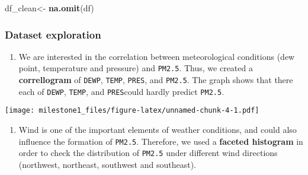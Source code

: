 \documentclass[]{article}
\newenvironment{Shaded}{\begin{snugshade}}{\end{snugshade}}
\newcommand{\CommentTok}[1]{\textcolor[rgb]{0.56,0.35,0.01}{\textit{#1}}}
\newcommand{\DataTypeTok}[1]{\textcolor[rgb]{0.13,0.29,0.53}{#1}}
\newcommand{\DecValTok}[1]{\textcolor[rgb]{0.00,0.00,0.81}{#1}}
\newcommand{\KeywordTok}[1]{\textcolor[rgb]{0.13,0.29,0.53}{\textbf{#1}}}
\newcommand{\NormalTok}[1]{#1}
\newcommand{\OperatorTok}[1]{\textcolor[rgb]{0.81,0.36,0.00}{\textbf{#1}}}
\newcommand{\OtherTok}[1]{\textcolor[rgb]{0.56,0.35,0.01}{#1}}
\newcommand{\StringTok}[1]{\textcolor[rgb]{0.31,0.60,0.02}{#1}}
\providecommand{\tightlist}{%
  \setlength{\itemsep}{0pt}\setlength{\parskip}{0pt}}
\begin{document}
\begin{Shaded}
\begin{Highlighting}[]
\NormalTok{df_clean<-}\StringTok{ }\KeywordTok{na.omit}\NormalTok{(df)}
\end{Highlighting}
\end{Shaded}

\hypertarget{dataset-exploration}{%
\subsubsection{Dataset exploration}\label{dataset-exploration}}

\begin{enumerate}
\def\labelenumi{\arabic{enumi}.}
\tightlist
\item
  We are interested in the correlation between meteorological conditions
  (dew point, temperature and pressure) and \texttt{PM2.5}. Thus, we
  created a \textbf{correllogram} of \texttt{DEWP}, \texttt{TEMP},
  \texttt{PRES}, and \texttt{PM2.5}. The graph shows that there each of
  \texttt{DEWP}, \texttt{TEMP}, and \texttt{PRES}could hardly predict
  \texttt{PM2.5}.
\end{enumerate}

\begin{Shaded}
\end{Shaded}

\texttt{[image: milestone1\_files/figure-latex/unnamed-chunk-4-1.pdf]}

\begin{enumerate}
\def\labelenumi{\arabic{enumi}.}
\setcounter{enumi}{1}
\tightlist
\item
  Wind is one of the important elements of weather conditions, and could
  also influence the formation of \texttt{PM2.5}. Therefore, we used a
  \textbf{faceted histogram} in order to check the distribution of
  \texttt{PM2.5} under different wind directions (northwest, northeast,
  southwest and southeast).
\end{enumerate}
\end{document}
